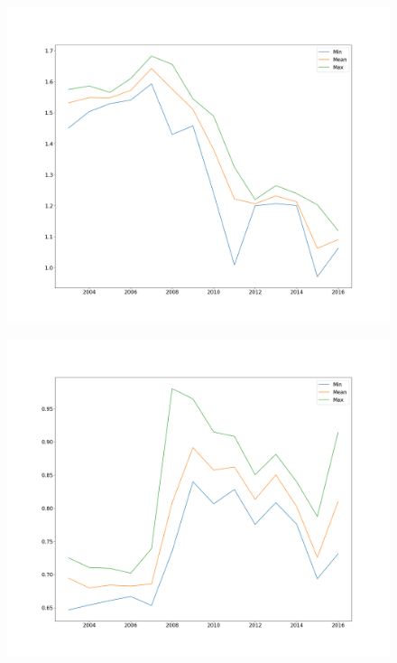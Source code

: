 \documentclass[a4paper]{article}
\begin{document}
\begin{figure}
\begin{minipage}{.5\textwidth}
		\label{fig:2}
	\end{minipage}
	\begin{minipage}{.5\textwidth}
	\centering
	\includegraphics[width=\linewidth]{Figures/stats_chf}
	\label{fig:3}
	\end{minipage}%
	\begin{minipage}{.5\textwidth}
	\centering
	\includegraphics[width=\linewidth]{Figures/stats_gbp}

\end{minipage}
\end{figure}
\end{document}
